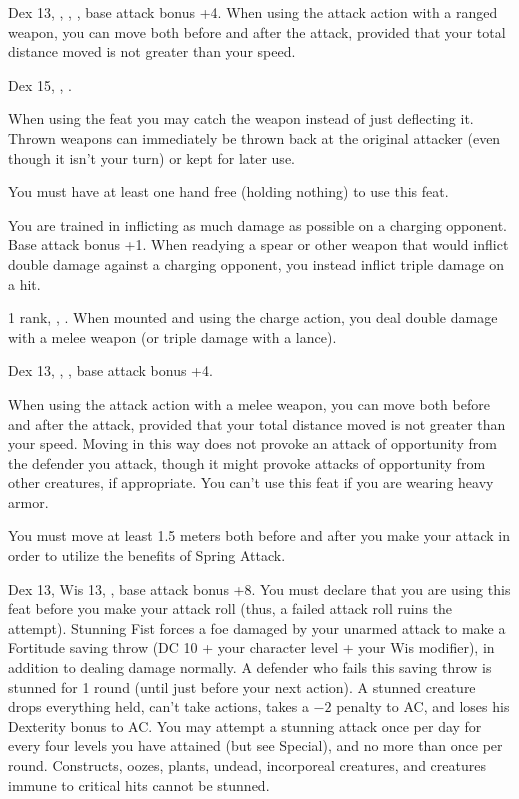 {Dex 13, , , , base attack bonus +4.}
{When using the attack action with a ranged weapon, you can move both before and after the attack, provided that your total distance moved is not greater than your speed.}

{Dex 15, , .}
{When using the  feat you may catch the weapon instead of just deflecting it. Thrown weapons can immediately be thrown back at the original attacker (even though it isn't your turn) or kept for later use.

You must have at least one hand free (holding nothing) to use this feat.}

{You are trained in inflicting as much damage as possible on a charging opponent.}
{Base attack bonus +1.}
{When readying a spear or other weapon that would inflict double damage against a charging opponent, you instead inflict triple damage on a hit.}{}{}

{ 1 rank, , .}
{When mounted and using the charge action, you deal double damage with a melee weapon (or triple damage with a lance).}

{Dex 13, , , base attack bonus +4.}
{When using the attack action with a melee weapon, you can move both before and after the attack, provided that your total distance moved is not greater than your speed. Moving in this way does not provoke an attack of opportunity from the defender you attack, though it might provoke attacks of opportunity from other creatures, if appropriate. You can't use this feat if you are wearing heavy armor.

You must move at least 1.5 meters both before and after you make your attack in order to utilize the benefits of Spring Attack.}

{Dex 13, Wis 13, , base attack bonus +8.}
{You must declare that you are using this feat before you make your attack roll (thus, a failed attack roll ruins the attempt). Stunning Fist forces a foe damaged by your unarmed attack to make a Fortitude saving throw (DC 10 + \onehalf your character level + your Wis modifier), in addition to dealing damage normally. A defender who fails this saving throw is stunned for 1 round (until just before your next action). A stunned creature drops everything held, can't take actions, takes a $-2$ penalty to AC, and loses his Dexterity bonus to AC. You may attempt a stunning attack once per day for every four levels you have attained (but see Special), and no more than once per round. Constructs, oozes, plants, undead, incorporeal creatures, and creatures immune to critical hits cannot be stunned.}

